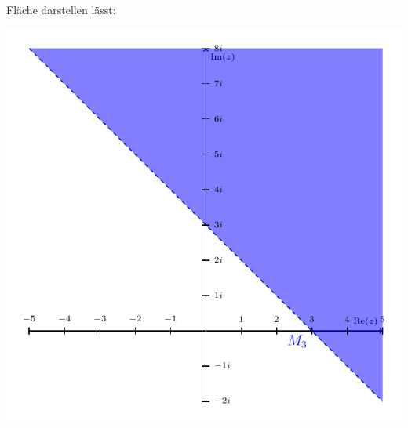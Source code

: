 \documentclass[a4paper,graphics,11pt]{article}
\begin{document}
Fläche darstellen lässt:\\
\strut\qquad\qquad\qquad\qquad\quad\includegraphics[scale=0.84]{graphics/graph3.pdf}
\end{document}
